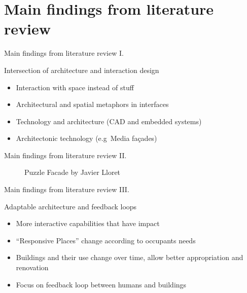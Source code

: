 \documentclass[10pt]{beamer}
\begin{document}

\section{Main findings from literature review}


\begin{frame}{Main findings from literature review I.}
	\begin{block}{Intersection of architecture and interaction design}
	\begin{itemize}
        \pause{}
		\item Interaction with space instead of stuff
        \pause{}
		\item Architectural and spatial metaphors in interfaces
        \pause{}
        \item Technology and architecture (CAD and embedded systems)
        \pause{}
        \item Architectonic technology (e.g\ Media fa\c{c}ades)
	\end{itemize}	
	\end{block}
\end{frame}


\begin{frame}{Main findings from literature review II.}
    \begin{figure}
    \centering
    \caption{Puzzle Facade by Javier Lloret}
    \end{figure}
\end{frame}


\begin{frame}{Main findings from literature review III.}
	\begin{block}{Adaptable architecture and feedback loops}
	\begin{itemize}
        \pause{}
		\item More interactive capabilities that have impact
        \pause{}
		\item ``Responsive Places'' change according to occupants needs
        \pause{}
        \item Buildings and their use change over time, allow better appropriation and renovation
        \pause{}
		\item Focus on feedback loop between humans and buildings
	\end{itemize}	
	\end{block}

\end{frame}
\end{document}
